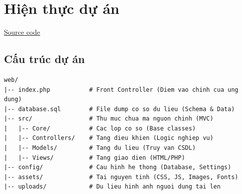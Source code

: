 \section{Hiện thực dự án}
\href{https://github.com/phuckhanhdev/CO3050_252/tree/main/web}{Source code}
\subsection{Cấu trúc dự án}
\begin{lstlisting}
web/
|-- index.php           # Front Controller (Diem vao chinh cua ung dung)
|-- database.sql        # File dump co so du lieu (Schema & Data)
|-- src/                # Thu muc chua ma nguon chinh (MVC)
|   |-- Core/           # Cac lop co so (Base classes)
|   |-- Controllers/    # Tang dieu khien (Logic nghiep vu)
|   |-- Models/         # Tang du lieu (Truy van CSDL)
|   |-- Views/          # Tang giao dien (HTML/PHP)
|-- config/             # Cau hinh he thong (Database, Settings)
|-- assets/             # Tai nguyen tinh (CSS, JS, Images, Fonts)
|-- uploads/            # Du lieu hinh anh nguoi dung tai len    
\end{lstlisting}

